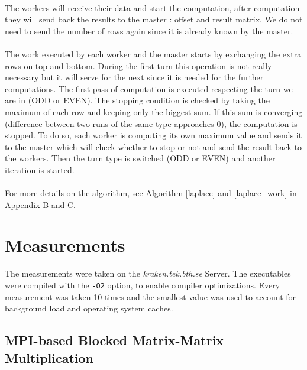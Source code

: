 \documentclass[]{article}
\begin{document}
\paragraph{} The workers will receive their data and start the computation, after computation they will send back the results to the master : offset and result matrix. We do not need to send the number of rows again since it is already known by the master. 

\paragraph{} The work executed by each worker and the master starts by exchanging the extra rows on top and bottom. During the first turn this operation is not really necessary but it will serve for the next since it is needed for the further computations. The first pass of computation is executed respecting the turn we are in (ODD or EVEN). The stopping condition is checked by taking the maximum of each row and keeping only the biggest sum. If this sum is converging (difference between two runs of the same type approaches $0$), the computation is stopped. To do so, each worker is computing its own maximum value and sends it to the master which will check whether to stop or not and send the result back to the workers. Then the turn type is switched (ODD or EVEN) and another iteration is started.

\paragraph{} For more details on the algorithm, see Algorithm \ref{laplace} and \ref{laplace_work} in Appendix B and C.

\section{Measurements}

The measurements were taken on the \emph{kraken.tek.bth.se} Server. The executables were compiled with the \texttt{-O2} option, to enable compiler optimizations. Every measurement was taken 10 times and the smallest value was used to account for background load and operating system caches.

\subsection{MPI-based Blocked Matrix-Matrix Multiplication}
\end{document}
